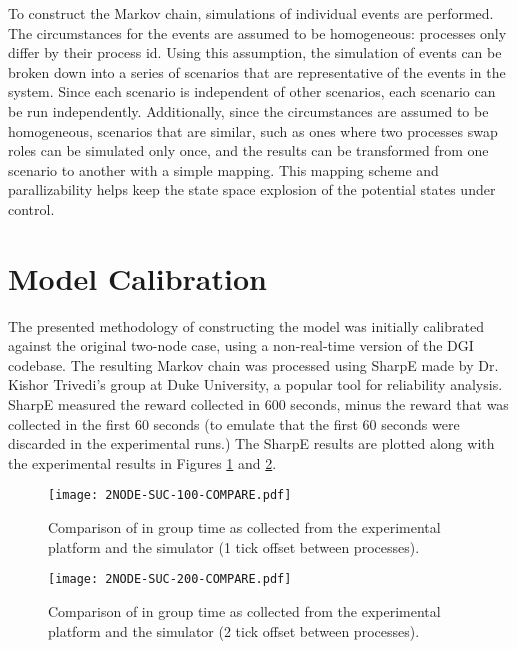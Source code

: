 To construct the Markov chain, simulations of individual events are performed. The circumstances
for the events are assumed to be homogeneous: processes only differ by their process id.
Using this assumption, the simulation of events can be broken down into a series of scenarios
that are representative of the events in the system. Since each scenario is independent of other
scenarios, each scenario can be run independently.  Additionally, since the circumstances
are assumed to be homogeneous, scenarios that are similar, such as ones where two processes
swap roles can be simulated only once, and the results can be transformed from one scenario
to another with a simple mapping. This mapping scheme and parallizability helps keep the
state space explosion of the potential states under control.

\section{Model Calibration}

The presented methodology of constructing the model was initially calibrated against the
original two-node case, using a non-real-time version of the DGI codebase. The resulting
Markov chain was processed using SharpE \cite{SHARPE}\cite{SHARPE2} made by Dr. Kishor
Trivedi's group at Duke University, a popular tool for reliability analysis. SharpE measured the reward collected in 600 seconds,
minus the reward that was collected in the first 60 seconds (to emulate that the first
60 seconds were discarded in the experimental runs.) The SharpE results are plotted along
with the experimental results in Figures \ref{fig:COMPARE-SUC-2NODE-100} and \ref{fig:COMPARE-SUC-2NODE-200}.

\begin{figure}[!h]
\centering
\texttt{[image: 2NODE-SUC-100-COMPARE.pdf]}
\caption{Comparison of in group time as collected from the experimental platform and the simulator (1 tick offset between processes).}
\label{fig:COMPARE-SUC-2NODE-100}
\end{figure}


\begin{figure}[!h]
\centering
\texttt{[image: 2NODE-SUC-200-COMPARE.pdf]}

\caption{Comparison of in group time as collected from the experimental platform and the simulator (2 tick offset between processes).}
\label{fig:COMPARE-SUC-2NODE-200}
\end{figure}

